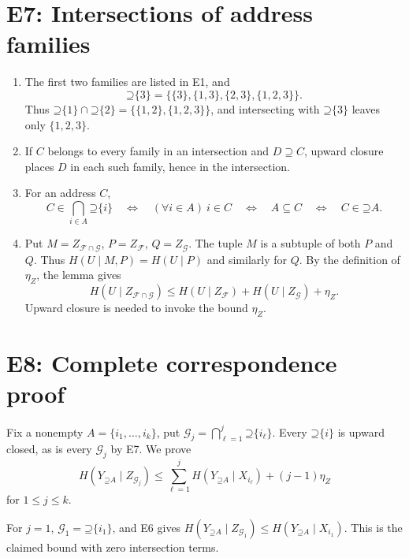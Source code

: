 \documentclass[11pt]{article}
\newcommand{\Up}{\mathord{\supseteq}}
\begin{document}
\section{E7: Intersections of address families}
\label{sec:e7}
\begin{enumerate}[label=(\alph*)]
\item The first two families are listed in E1, and
\[
 \Up\{3\}=\{\{3\},\{1,3\},\{2,3\},\{1,2,3\}\}.
\]
Thus $\Up\{1\}\cap\Up\{2\}=\{\{1,2\},\{1,2,3\}\}$,
and intersecting with $\Up\{3\}$ leaves only $\{1,2,3\}$.
\item If $C$ belongs to every family in an intersection and $D\supseteq C$,
upward closure places $D$ in each such family, hence in the intersection.
\item For an address $C$,
\[
 C\in\bigcap_{i\in A}\Up\{i\}
 \quad\Longleftrightarrow\quad
 (\forall i\in A)\ i\in C
 \quad\Longleftrightarrow\quad A\subseteq C
 \quad\Longleftrightarrow\quad C\in\Up A.
\]
\item Put $M=Z_{\mathcal{F}\cap\mathcal{G}}$,
$P=Z_{\mathcal{F}}$, $Q=Z_{\mathcal{G}}$. The tuple $M$ is a subtuple of
both $P$ and $Q$. Thus $H(U\mid M,P)=H(U\mid P)$ and similarly for $Q$.
By the definition of $\eta_Z$, the lemma gives
\[
 H(U\mid Z_{\mathcal{F}\cap\mathcal{G}})
 \le H(U\mid Z_{\mathcal{F}})+H(U\mid Z_{\mathcal{G}})+\eta_Z.
\]
Upward closure is needed to invoke the bound $\eta_Z$.
\end{enumerate}

\section{E8: Complete correspondence proof}
\label{sec:e8}
Fix a nonempty $A=\{i_1,\ldots,i_k\}$, put
$\mathcal{G}_j=\bigcap_{\ell=1}^{j}\Up\{i_\ell\}$.
Every $\Up\{i\}$ is upward closed, as is every $\mathcal{G}_j$ by E7.
We prove
\begin{equation}
 H(Y_{\Up A}\mid Z_{\mathcal{G}_j})\le
 \sum_{\ell=1}^{j}H(Y_{\Up A}\mid X_{i_\ell})+(j-1)\eta_Z
 \label{eq:induction-sol}
\end{equation}
for $1\le j\le k$.

For $j=1$, $\mathcal{G}_1=\Up\{i_1\}$, and E6 gives
$H(Y_{\Up A}\mid Z_{\mathcal{G}_1})\le H(Y_{\Up A}\mid X_{i_1})$. This is the claimed
bound with zero intersection terms.
\end{document}
